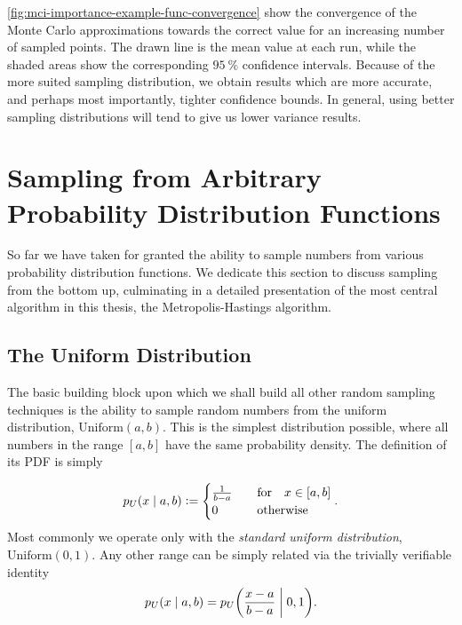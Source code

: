 \documentclass[Thesis.tex]{subfiles}
\begin{document}
\autoref{fig:mci-importance-example-func-convergence} show the convergence of
the Monte Carlo approximations towards the correct value for an increasing
number of sampled points. The drawn line is the mean value at each run, while
the shaded areas show the corresponding $\SI{95}{\percent}$ confidence
intervals. Because of the more suited sampling distribution, we obtain results
which are more accurate, and perhaps most importantly, tighter confidence
bounds. In general, using better sampling distributions will tend to give us
lower variance results.

\section{Sampling from Arbitrary Probability Distribution Functions}
\label{sec:sampling-arb-prob-dist-funcs}

So far we have taken for granted the ability to sample numbers from various
probability distribution functions. We dedicate this section to discuss sampling from the bottom up, culminating in a detailed presentation of the most central algorithm in this thesis, the Metropolis-Hastings algorithm.

\subsection{The Uniform Distribution}

The basic building block upon which we shall build all other random sampling
techniques is the ability to sample random numbers from the uniform
distribution, $\text{Uniform}(a, b)$. This is the simplest distribution
possible, where all numbers in the range $[a, b]$ have the same probability
density. The definition of its PDF is simply

\begin{align}\label{eq:uniform-pdf-definition}
    p_U\qty(x\;\middle|\; a, b) \defeq  \begin{cases}
        \frac{1}{b - a} &\qfor x\in [a, b]\\
        0&\qotherwise
    \end{cases}.
\end{align}
Most commonly we operate only with the \emph{standard uniform distribution}, $\text{Uniform}(0, 1)$. Any other range can be simply related via the trivially verifiable identity
\begin{align}
    p_U\qty(x\;\middle|\; a,b) = p_U\qty( \frac{x-a}{b-a} \;\middle|\; 0, 1).
\end{align}
\end{document}
